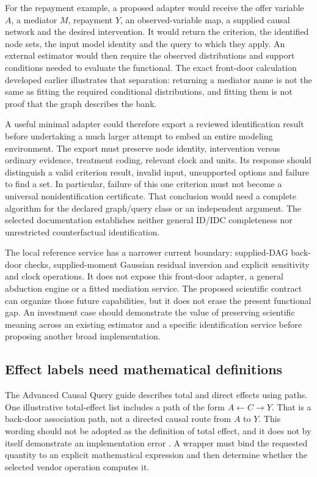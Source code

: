 For the repayment example, a proposed adapter would receive the offer variable
$A$, a mediator $M$, repayment $Y$, an observed-variable map, a supplied causal
network and the desired intervention. It would return the criterion, the
identified node sets, the input model identity and the query to which they
apply. An external estimator would then require the observed distributions
and support conditions needed to evaluate the functional. The exact
front-door calculation developed earlier illustrates that separation:
returning a mediator name is not the same as fitting the required conditional
distributions, and fitting them is not proof that the graph describes the bank.

A useful minimal adapter could therefore export a reviewed identification
result before undertaking a much larger attempt to embed an entire modeling
environment. The export must preserve node identity, intervention versus
ordinary evidence, treatment coding, relevant clock and units. Its response
should distinguish a valid criterion result, invalid input, unsupported
options and failure to find a set. In particular, failure of this one
criterion must not become a universal nonidentification certificate. That
conclusion would need a complete algorithm for the declared graph/query class
or an independent argument. The selected documentation establishes neither
general ID/IDC completeness nor unrestricted counterfactual identification.

The local reference service has a narrower current boundary: supplied-DAG
back-door checks, supplied-moment Gaussian residual inversion and explicit
sensitivity and clock operations. It does not expose this front-door adapter,
a general abduction engine or a fitted mediation service. The proposed
scientific contract can organize those future capabilities, but it does not
erase the present functional gap. An investment case should demonstrate the
value of preserving scientific meaning across an existing estimator and a
specific identification service before proposing another broad implementation.

\subsection{Effect labels need mathematical definitions}

The Advanced Causal Query guide describes total and direct effects using paths.
One illustrative total-effect list includes a path of the form
$A\leftarrow C\rightarrow Y$. That is a back-door association path, not a
directed causal route from $A$ to $Y$. This wording should not be adopted as
the definition of total effect, and it does not by itself demonstrate an
implementation error \citep{exec14_ci_causal_query}. A wrapper must bind the
requested quantity to an explicit mathematical expression and then determine
whether the selected vendor operation computes it.

